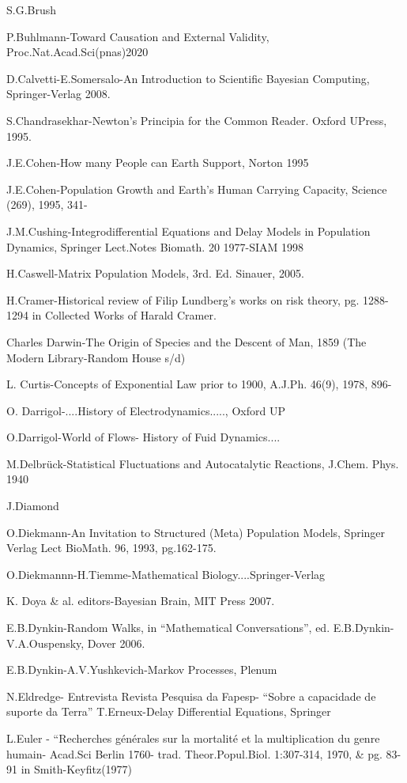 S.G.Brush 

P.Buhlmann-Toward Causation and External Validity, Proc.Nat.Acad.Sci(pnas)2020 

D.Calvetti-E.Somersalo-An Introduction to Scientific Bayesian Computing, Springer-Verlag 2008. 

S.Chandrasekhar-Newton’s Principia for the Common Reader. Oxford UPress, 1995. 

J.E.Cohen-How many People can Earth Support, Norton 1995 

J.E.Cohen-Population Growth and Earth’s Human Carrying Capacity, Science (269), 1995, 341- 

J.M.Cushing-Integrodifferential Equations and Delay Models in Population Dynamics, Springer Lect.Notes Biomath. 20 1977-SIAM 1998

H.Caswell-Matrix Population Models, 3rd. Ed. Sinauer, 2005. 

H.Cramer-Historical review of Filip Lundberg’s works on risk theory, pg. 1288-1294 in Collected Works of Harald Cramer. 

Charles Darwin-The Origin of Species and the Descent of Man, 1859 (The Modern Library-Random House s/d) 

L. Curtis-Concepts of Exponential Law prior to 1900, A.J.Ph. 46(9), 1978, 896-

O. Darrigol-....History of Electrodynamics....., Oxford UP 

O.Darrigol-World of Flows- History of Fuid Dynamics.... 

M.Delbrück-Statistical Fluctuations and Autocatalytic Reactions, J.Chem. Phys. 1940 

J.Diamond 

O.Diekmann-An Invitation to Structured (Meta) Population Models, Springer Verlag Lect BioMath. 96, 1993, pg.162-175. 

O.Diekmannn-H.Tiemme-Mathematical Biology....Springer-Verlag 

K. Doya \& al. editors-Bayesian Brain, MIT Press 2007. 

E.B.Dynkin-Random Walks, in ``Mathematical Conversations'', ed. E.B.Dynkin-V.A.Ouspensky, Dover 2006. 

E.B.Dynkin-A.V.Yushkevich-Markov Processes, Plenum 

N.Eldredge- Entrevista Revista Pesquisa da Fapesp- ``Sobre a capacidade de suporte da Terra'' 
T.Erneux-Delay Differential Equations, Springer 

L.Euler - ``Recherches générales sur la mortalité et la multiplication du genre humain- Acad.Sci Berlin 1760- trad. Theor.Popul.Biol. 1:307-314, 1970, \& pg. 83-91 in Smith-Keyfitz(1977)

